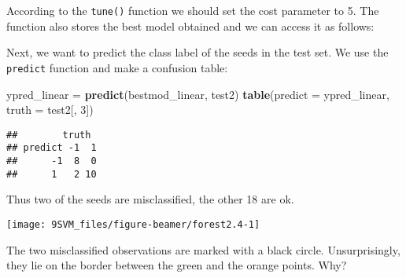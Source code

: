 \documentclass[10pt,ignorenonframetext,]{beamer}
\newenvironment{Shaded}{\begin{snugshade}}{\end{snugshade}}
\newcommand{\DataTypeTok}[1]{\textcolor[rgb]{0.13,0.29,0.53}{#1}}
\newcommand{\DecValTok}[1]{\textcolor[rgb]{0.00,0.00,0.81}{#1}}
\newcommand{\KeywordTok}[1]{\textcolor[rgb]{0.13,0.29,0.53}{\textbf{#1}}}
\newcommand{\NormalTok}[1]{#1}
\newcommand{\OperatorTok}[1]{\textcolor[rgb]{0.81,0.36,0.00}{\textbf{#1}}}
\newcommand{\StringTok}[1]{\textcolor[rgb]{0.31,0.60,0.02}{#1}}
\begin{document}
\begin{frame}[fragile]

According to the \texttt{tune()} function we should set the cost
parameter to 5. The function also stores the best model obtained and we
can access it as follows:

\scriptsize

\begin{Shaded}
\end{Shaded}

\normalsize

Next, we want to predict the class label of the seeds in the test set.
We use the \texttt{predict} function and make a confusion table:

\scriptsize

\begin{Shaded}
\begin{Highlighting}[]
\NormalTok{ypred_linear =}\StringTok{ }\KeywordTok{predict}\NormalTok{(bestmod_linear, test2)}
\KeywordTok{table}\NormalTok{(}\DataTypeTok{predict =}\NormalTok{ ypred_linear, }\DataTypeTok{truth =}\NormalTok{ test2[, }\DecValTok{3}\NormalTok{])}
\end{Highlighting}
\end{Shaded}

\begin{verbatim}
##        truth
## predict -1  1
##      -1  8  0
##      1   2 10
\end{verbatim}

\normalsize

Thus two of the seeds are misclassified, the other 18 are ok.

\end{frame}

\begin{frame}

\footnotesize

\begin{center}\texttt{[image: 9SVM\_files/figure-beamer/forest2.4-1]} \end{center}

\normalsize

The two misclassified observations are marked with a black circle.
Unsurprisingly, they lie on the border between the green and the orange
points. Why?

\end{frame}
\end{document}
